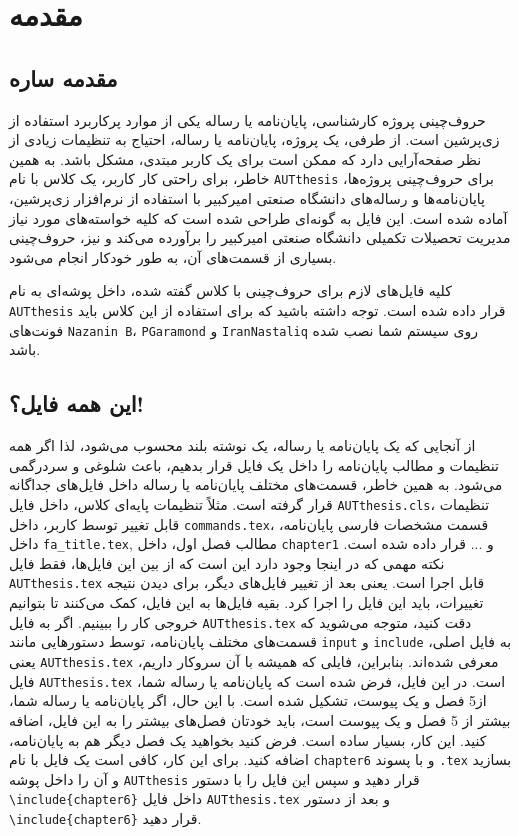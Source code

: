 \chapter{مقدمه}

\section{مقدمه ساره}
حروف‌چینی پروژه کارشناسی، پایان‌نامه یا رساله یکی از موارد پرکاربرد استفاده از زی‌پرشین است. از طرفی، یک پروژه، پایان‌نامه یا رساله،  احتیاج به تنظیمات زیادی از نظر صفحه‌آرایی  دارد که ممکن است برای
یک کاربر مبتدی، مشکل باشد. به همین خاطر، برای راحتی کار کاربر، یک کلاس با نام 
\verb;AUTthesis;
 برای حروف‌چینی پروژه‌ها، پایان‌نامه‌ها و رساله‌های دانشگاه صنعتی امیرکبیر با استفاده از نرم‌افزار زی‌پرشین،  آماده شده است. این فایل به 
گونه‌ای طراحی شده است که کلیه خواسته‌های مورد نیاز  مدیریت تحصیلات تکمیلی دانشگاه صنعتی امیرکبیر را برآورده می‌کند و نیز، حروف‌چینی بسیاری
از قسمت‌های آن، به طور خودکار انجام می‌شود.

کلیه فایل‌های لازم برای حروف‌چینی با کلاس گفته شده، داخل پوشه‌ای به نام
\verb;AUTthesis;
  قرار داده شده است. توجه داشته باشید که برای استفاده از این کلاس باید فونت‌های
  \verb;Nazanin B;،
 \verb;PGaramond;
 و
  \verb;IranNastaliq;
    روی سیستم شما نصب شده باشد.
\section{این همه فایل؟!}\label{sec2}
از آنجایی که یک پایان‌نامه یا رساله، یک نوشته بلند محسوب می‌شود، لذا اگر همه تنظیمات و مطالب پایان‌نامه را داخل یک فایل قرار بدهیم، باعث شلوغی
و سردرگمی می‌شود. به همین خاطر، قسمت‌های مختلف پایان‌نامه یا رساله  داخل فایل‌های جداگانه قرار گرفته است. مثلاً تنظیمات پایه‌ای کلاس، داخل فایل
\verb;AUTthesis.cls;، 
تنظیمات قابل تغییر توسط کاربر، داخل 
\verb;commands.tex;،
قسمت مشخصات فارسی پایان‌نامه، داخل 
\verb;fa_title.tex;,
مطالب فصل اول، داخل 
\verb;chapter1;
و ... قرار داده شده است. نکته مهمی که در اینجا وجود دارد این است که از بین این  فایل‌ها، فقط فایل 
\verb;AUTthesis.tex;
قابل اجرا است. یعنی بعد از تغییر فایل‌های دیگر، برای دیدن نتیجه تغییرات، باید این فایل را اجرا کرد. بقیه فایل‌ها به این فایل، کمک می‌کنند تا بتوانیم خروجی کار را ببینیم. اگر به فایل 
\verb;AUTthesis.tex;
دقت کنید، متوجه می‌شوید که قسمت‌های مختلف پایان‌نامه، توسط دستورهایی مانند 
\verb;input;
و
\verb;include;
به فایل اصلی، یعنی 
\verb;AUTthesis.tex;
معرفی شده‌اند. بنابراین، فایلی که همیشه با آن سروکار داریم، فایل 
\verb;AUTthesis.tex;
است.
در این فایل، فرض شده است که پایان‌نامه یا رساله شما، از5 فصل و یک پیوست، تشکیل شده است. با این حال، اگر
  پایان‌نامه یا رساله شما، بیشتر از 5 فصل و یک پیوست است، باید خودتان فصل‌های بیشتر را به این فایل، اضافه کنید. این کار، بسیار ساده است. فرض کنید بخواهید یک فصل دیگر هم به پایان‌نامه، اضافه کنید. برای این کار، کافی است یک فایل با نام 
\verb;chapter6;
و با پسوند 
\verb;.tex;
بسازید و آن را داخل پوشه 
\verb;AUTthesis;
قرار دهید و سپس این فایل را با دستور 
\texttt{\textbackslash include\{chapter6\}}
داخل فایل
\verb;AUTthesis.tex;
و بعد از دستور
\texttt{\textbackslash include\{chapter6\}}
 قرار دهید.

